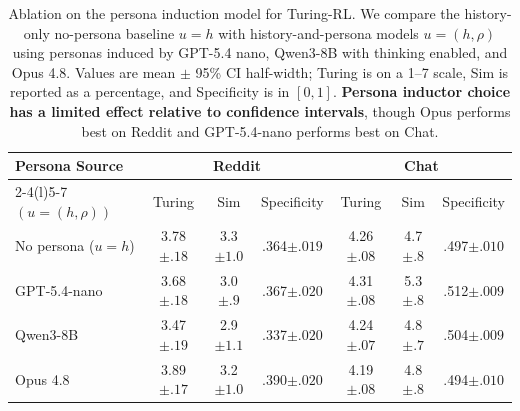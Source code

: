 \documentclass[11pt]{article}
\newcommand{\subtle}[1]{{\tiny\color[gray]{0.4}#1}}
\begin{document}
\begin{table}[t]
\centering
\small
\setlength{\tabcolsep}{6pt}
\begin{tabular*}{\textwidth}{@{\extracolsep{\fill}}lcccccc@{}}
\toprule
Persona Source & \multicolumn{3}{c}{Reddit} & \multicolumn{3}{c}{Chat} \\
\cmidrule(lr){2-4}\cmidrule(l){5-7}
$(u=(h,\rho))$ & Turing & Sim & Specificity & Turing & Sim & Specificity \\
\midrule
No persona ($u=h$) & 3.78\subtle{$\pm .18$} & 3.3\subtle{$\pm 1.0$} & .364\subtle{$\pm .019$} & 4.26\subtle{$\pm .08$} & 4.7\subtle{$\pm .8$} & .497\subtle{$\pm .010$} \\
GPT-5.4-nano & 3.68\subtle{$\pm .18$} & 3.0\subtle{$\pm .9$} & .367\subtle{$\pm .020$} & 4.31\subtle{$\pm .08$} & 5.3\subtle{$\pm .8$} & .512\subtle{$\pm .009$} \\
Qwen3-8B & 3.47\subtle{$\pm .19$} & 2.9\subtle{$\pm 1.1$} & .337\subtle{$\pm .020$} & 4.24\subtle{$\pm .07$} & 4.8\subtle{$\pm .7$} & .504\subtle{$\pm .009$} \\
Opus 4.8 & 3.89\subtle{$\pm .17$} & 3.2\subtle{$\pm 1.0$} & .390\subtle{$\pm .020$} & 4.19\subtle{$\pm .08$} & 4.8\subtle{$\pm .8$} & .494\subtle{$\pm .010$} \\
\bottomrule
\end{tabular*}
\caption{Ablation on the persona induction model for Turing-RL. We compare the history-only no-persona baseline $u=h$ with history-and-persona models $u=(h,\rho)$ using personas induced by GPT-5.4 nano, Qwen3-8B with thinking enabled, and Opus 4.8. Values are mean $\pm$ 95\% CI half-width; Turing is on a 1--7 scale, Sim is reported as a percentage, and Specificity is in $[0,1]$. \textbf{Persona inductor choice has a limited effect relative to confidence intervals}, though Opus performs best on Reddit and GPT-5.4-nano performs best on Chat.}
\label{tab:persona_inductor_ablation}
\vspace{-0.3cm}
\end{table}


\end{document}
